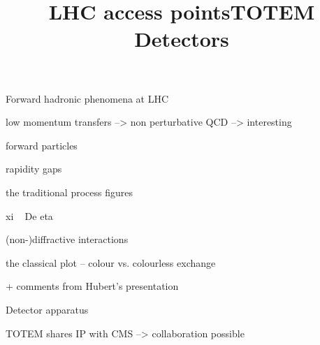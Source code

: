 Forward hadronic phenomena at LHC

\> low momentum transfers --> non perturbative QCD --> interesting

\> forward particles

\> rapidity gaps

\> the traditional process figures

\> xi ~ De eta


\newpage %
\title{}


\newpage %
\title{}

(non-)diffractive interactions

the classical plot -- colour vs. colourless exchange 

\newpage %
\title{}


+ comments from Hubert's presentation

\newpage %
\title{}


\newpage %
\hbox{}
\vfil

\vskip2mm
\centerline{\PartFont\cYe Detector apparatus\cFg}

\vfil


\newpage %
\title{LHC access points}


\> TOTEM shares IP with CMS --> collaboration possible

\newpage %
\title{TOTEM Detectors}

\vfil


